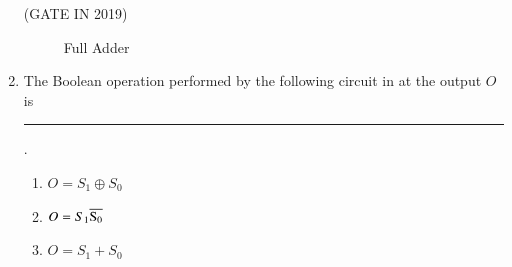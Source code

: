 \begin{enumerate}[label=\arabic*.,ref=\theenumi]
	               \hfill(GATE IN 2019)
\begin{figure}[H] 
    \centering
    \resizebox{0.75\columnwidth}{!}{%
	
	}
	\caption{Full Adder}
	\label{fig:GATE-IN2019,22}
\end{figure}
\item The Boolean operation performed by the following  circuit 
in
	at the output $O$ is \rule{1cm}{0.1pt}.
%
\begin{enumerate}

            \item  $O=S_1\oplus S_0$ 
            
            \item  $O=S_1\overline{\rm S_0}$
            
            \item  $O=S_1 + S_0$
            

\end{enumerate}
\end{enumerate}
